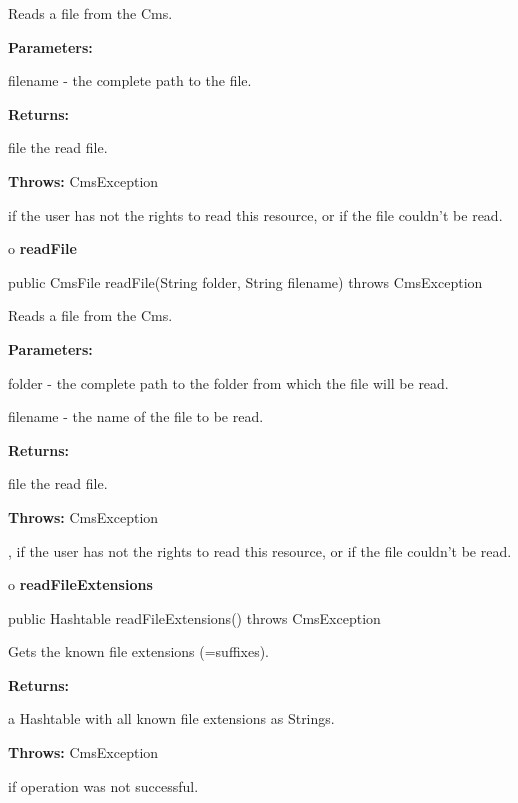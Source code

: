 \begin{description}
\htmlDD Reads a file from the Cms. 

\begin{description}
\item {\bf Parameters:}  

filename - the complete path to the file.  
\item {\bf Returns:}  

file the read file.  
\item {\bf Throws:} CmsException  

if the user has not the rights to read this resource, or if the file couldn't
be read.  
\end{description}

\end{description}

o {\bf readFile} 

\begin{PRE}
 public CmsFile readFile(String folder,
                         String filename) throws CmsException
\end{PRE}

\begin{description}
\htmlDD Reads a file from the Cms. 

\begin{description}
\item {\bf Parameters:}  

folder - the complete path to the folder from which the file will be read.  

filename - the name of the file to be read.  
\item {\bf Returns:}  

file the read file.  
\item {\bf Throws:} CmsException  

, if the user has not the rights to read this resource, or if the file
couldn't be read.  
\end{description}

\end{description}

o {\bf readFileExtensions} 

\begin{PRE}
 public Hashtable readFileExtensions() throws CmsException
\end{PRE}

\begin{description}
\htmlDD Gets the known file extensions (=suffixes). 

\begin{description}
\item {\bf Returns:}  

a Hashtable with all known file extensions as Strings.  
\item {\bf Throws:} CmsException  

if operation was not successful.  
\end{description}

\end{description}

